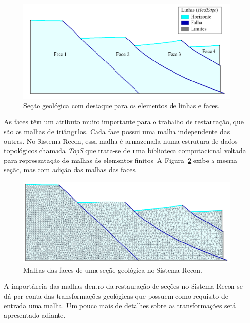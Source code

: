 \begin{figure} [h]
  \begin{center}
    \includegraphics[width=\textwidth]{images/fig-recon-2}
    \caption{Seção geológica com destaque para os elementos de linhas e faces.}\label{fig-recon-2}
  \end{center}
\end{figure}

As faces têm um atributo muito importante para o trabalho de restauração, que são as malhas de triângulos. Cada face possui uma malha independente das outras. No Sistema Recon, essa malha é armazenada numa estrutura de dados topológicos chamada \textit{TopS} que trata-se de uma biblioteca computacional voltada para representação de malhas de elementos finitos.\cite{Tops} A Figura~\ref{fig-recon-3} exibe a mesma seção, mas com adição das malhas das faces.

\begin{figure} [H]
  \begin{center}
    \includegraphics[width=350pt]{images/fig-recon-3}
    \caption{Malhas das faces de uma seção geológica no Sistema Recon.}\label{fig-recon-3}
  \end{center}
\end{figure}

A importância das malhas dentro da restauração de seções no Sistema Recon se dá por conta das transformações geológicas que possuem como requisito de entrada uma malha. Um pouco mais de detalhes sobre as transformações será apresentado adiante.

